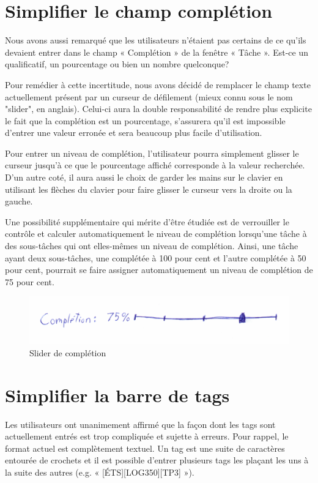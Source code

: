 \documentclass[letterpaper, oneside, 12pt, these, creativecommons]{thETS}
\begin{document}
\section{Simplifier le champ complétion}

Nous avons aussi remarqué que les utilisateurs n'étaient pas certains de ce qu'ils devaient entrer dans le champ « Complétion » de la fenêtre « Tâche ». Est-ce un qualificatif, un pourcentage ou bien un nombre quelconque?

Pour remédier à cette incertitude, nous avons décidé de remplacer le champ texte actuellement présent par un curseur de défilement (mieux connu sous le nom "slider", en anglais). Celui-ci aura la double responsabilité de rendre plus explicite le fait que la complétion est un pourcentage, s'assurera qu'il est impossible d'entrer une valeur erronée et sera beaucoup plus facile d'utilisation.

Pour entrer un niveau de complétion, l'utilisateur pourra simplement glisser le curseur jusqu'à ce que le pourcentage affiché corresponde à la valeur recherchée. D'un autre coté, il aura aussi le choix de garder les mains sur le clavier en utilisant les flèches du clavier pour faire glisser le curseur vers la droite ou la gauche.

Une possibilité supplémentaire qui mérite d'être étudiée est de verrouiller le contrôle et calculer automatiquement le niveau de complétion lorsqu'une tâche à des sous-tâches qui ont elles-mêmes un niveau de complétion. Ainsi, une tâche ayant deux sous-tâches, une complétée à 100 pour cent et l'autre complétée à 50 pour cent, pourrait se faire assigner automatiquement un niveau de complétion de 75 pour cent.

\begin{figure}
    \includegraphics[scale=0.25]{completion2.png}
    \caption{Slider de complétion}
\end{figure}

\section{Simplifier la barre de tags}

Les utilisateurs ont unanimement affirmé que la façon dont les tags sont actuellement entrés est trop compliquée et sujette à erreurs. Pour rappel, le format actuel est complètement textuel. Un tag est une suite de caractères entourée de crochets et il est possible d'entrer plusieurs tags les plaçant les uns à la suite des autres (e.g. « [ÉTS][LOG350][TP3] »).
\end{document}
